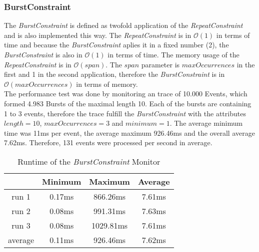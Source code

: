 \subsubsection{BurstConstraint}
	The \emph{BurstConstraint} is defined as twofold application of the \emph{RepeatConstraint} and is also implemented this way. The \emph{RepeatConstraint} is in $\mathcal{O}(1)$ in terms of time and because the \emph{BurstConstraint} aplies it in a fixed number (2), the \emph{BurstConstraint} is also in $\mathcal{O}(1)$ in terms of time. The memory usage of the \emph{RepeatConstraint} is in $\mathcal{O}(span)$. The $span$ parameter is $maxOccurrences$ in the first and 1 in the second application, therefore the \emph{BurstConstraint} is in $\mathcal{O}(maxOccurrences)$ in terms of memory.\\
	The performance test was done by monitoring an trace of 10.000 Events, which formed 4.983 Bursts of the maximal length 10. Each of the bursts are containing 1 to 3 events, therefore the trace fulfill the \emph{BurstConstraint} with the attributes $length = 10$, $maxOccurrences=3$ and $minimum=1$. The average minimum time was 11ms per event, the average maximum 926.46ms and the overall average 7.62ms. Therefore, 131 events were processed per second in average.
	
	\begin{table}
		\begin{tabular}{|c|c|c|c|}
			\hline
					& Minimum & Maximum & Average \\
			\hline
			run 1	& 0.17ms & 866.26ms & 7.61ms \\
			\hline
			run 2	& 0.08ms & 991.31ms & 7.63ms\\
			\hline
			run 3	& 0.08ms & 1029.81ms & 7.61ms\\
			\hline
			average & 0.11ms & 926.46ms & 7.62ms\\
			\hline
		\end{tabular}
		\centering
		\label{tab:runtimeBurstConstraint}
		\caption{Runtime of the \emph{BurstConstraint} Monitor}
	\end{table}

